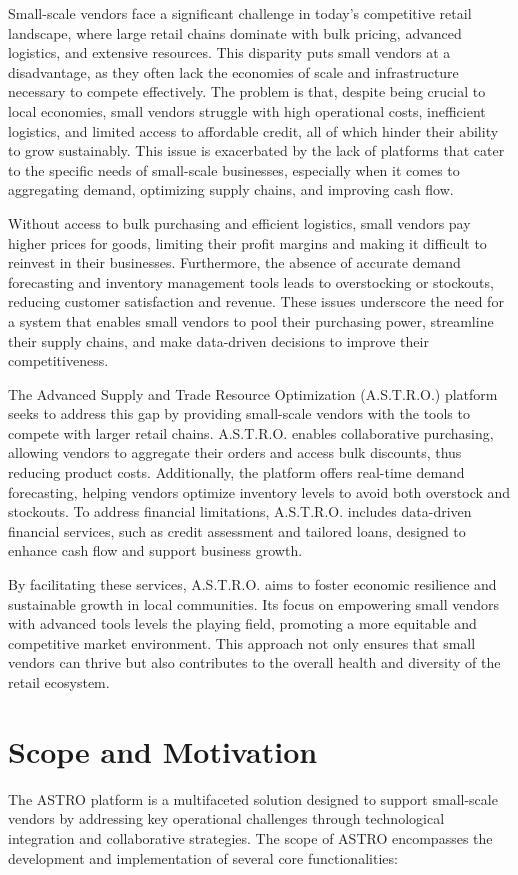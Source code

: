 Small-scale vendors face a significant challenge in today’s competitive retail landscape, where large retail chains dominate with bulk pricing, advanced logistics, and extensive resources. This disparity puts small vendors at a disadvantage, as they often lack the economies of scale and infrastructure necessary to compete effectively. The problem is that, despite being crucial to local economies, small vendors struggle with high operational costs, inefficient logistics, and limited access to affordable credit, all of which hinder their ability to grow sustainably. This issue is exacerbated by the lack of platforms that cater to the specific needs of small-scale businesses, especially when it comes to aggregating demand, optimizing supply chains, and improving cash flow.

Without access to bulk purchasing and efficient logistics, small vendors pay higher prices for goods, limiting their profit margins and making it difficult to reinvest in their businesses. Furthermore, the absence of accurate demand forecasting and inventory management tools leads to overstocking or stockouts, reducing customer satisfaction and revenue. These issues underscore the need for a system that enables small vendors to pool their purchasing power, streamline their supply chains, and make data-driven decisions to improve their competitiveness.

The Advanced Supply and Trade Resource Optimization (A.S.T.R.O.) platform seeks to address this gap by providing small-scale vendors with the tools to compete with larger retail chains. A.S.T.R.O. enables collaborative purchasing, allowing vendors to aggregate their orders and access bulk discounts, thus reducing product costs. Additionally, the platform offers real-time demand forecasting, helping vendors optimize inventory levels to avoid both overstock and stockouts. To address financial limitations, A.S.T.R.O. includes data-driven financial services, such as credit assessment and tailored loans, designed to enhance cash flow and support business growth.

By facilitating these services, A.S.T.R.O. aims to foster economic resilience and sustainable growth in local communities. Its focus on empowering small vendors with advanced tools levels the playing field, promoting a more equitable and competitive market environment. This approach not only ensures that small vendors can thrive but also contributes to the overall health and diversity of the retail ecosystem.

\section{Scope and Motivation}
The ASTRO platform is a multifaceted solution designed to support small-scale vendors by addressing key operational challenges through technological integration and collaborative strategies. The scope of ASTRO encompasses the development and implementation of several core functionalities:

